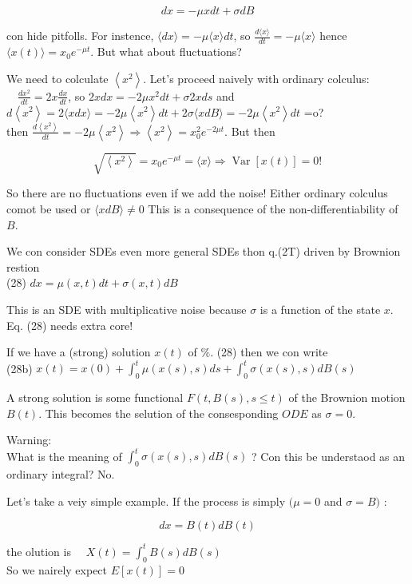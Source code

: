 \documentclass[10pt]{article}
\begin{document}
$$
d x=-\mu x d t+\sigma d B
$$

con hide pitfolls. For instence, $\langle d x\rangle=-\mu\langle x\rangle d t$, so $\frac{d\langle x\rangle}{d t}=-\mu\langle x\rangle$ hence $\langle x(t)\rangle=x_{0} e^{-\mu t}$. But what about fluctuations?

We need to colculate $\left\langle x^{2}\right\rangle$. Let's proceed naively with ordinary colculus: $\quad \frac{d x^{2}}{d t}=2 x \frac{d x}{d t}$, so $2 x d x=-2 \mu x^{2} d t+\sigma 2 x d s$ and $d\left\langle x^{2}\right\rangle=2\langle x d x\rangle=-2 \mu\left\langle x^{2}\right\rangle d t+2 \sigma\langle x d B\rangle=-2 \mu\left\langle x^{2}\right\rangle d t$ =o?\\
then $\frac{d\left\langle x^{2}\right\rangle}{d t}=-2 \mu\left\langle x^{2}\right\rangle \Rightarrow\left\langle x^{2}\right\rangle=x_{0}^{2} e^{-2 \mu t}$. But then

$$
\sqrt{\left\langle x^{2}\right\rangle}=x_{0} e^{-\mu t}=\langle x\rangle \Rightarrow \operatorname{Var}[x(t)]=0!
$$

So there are no fluctuations even if we add the noise! Either ordinary colculus comot be used or $\langle x d B\rangle \neq 0$ This is a consequence of the non-differentiability of $B$.

We con consider SDEs even more general SDEs thon q.(2T) driven by Brownion restion\\
(28) $d x=\mu(x, t) d t+\sigma(x, t) d B$

This is an SDE with multiplicative noise because $\sigma$ is a function of the state $x$. Eq. (28) needs extra core!

If we have a (strong) solution $x(t)$ of $\%$. (28) then we con write\\
(28b) $x(t)=x(0)+\int_{0}^{t} \mu(x(s), s) d s+\int_{0}^{t} \sigma(x(s), s) d B(s)$

A strong solution is some functional $F(t, B(s), s \leq t)$ of the Brownion motion $B(t)$. This becomes the selution of the consesponding $O D E$ as $\sigma=0$.

Warning:\\
What is the meaning of $\int_{0}^{t} \sigma(x(s), s) d B(s)$ ? Con this be understaod as an ordinary integral? No.

Let's take a veiy simple example. If the process is simply $(\mu=0$ and $\sigma=B)$ :

$$
d x=B(t) d B(t)
$$

the olution is $\quad X(t)=\int_{0}^{t} B(s) d B(s)$\\
So we nairely expect $E[x(t)]=0$
\end{document}

